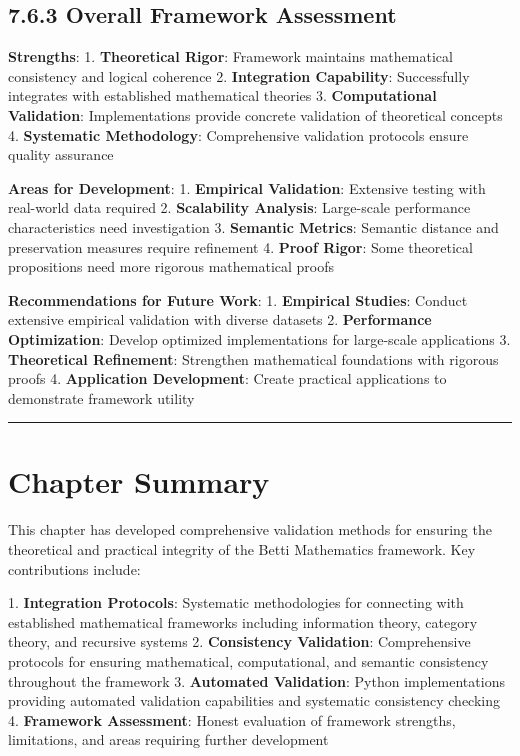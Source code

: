 \subsection{7.6.3 Overall Framework Assessment}

\textbf{Strengths}:
1. \textbf{Theoretical Rigor}: Framework maintains mathematical consistency and logical coherence
2. \textbf{Integration Capability}: Successfully integrates with established mathematical theories
3. \textbf{Computational Validation}: Implementations provide concrete validation of theoretical concepts
4. \textbf{Systematic Methodology}: Comprehensive validation protocols ensure quality assurance

\textbf{Areas for Development}:
1. \textbf{Empirical Validation}: Extensive testing with real-world data required
2. \textbf{Scalability Analysis}: Large-scale performance characteristics need investigation
3. \textbf{Semantic Metrics}: Semantic distance and preservation measures require refinement
4. \textbf{Proof Rigor}: Some theoretical propositions need more rigorous mathematical proofs

\textbf{Recommendations for Future Work}:
1. \textbf{Empirical Studies}: Conduct extensive empirical validation with diverse datasets
2. \textbf{Performance Optimization}: Develop optimized implementations for large-scale applications
3. \textbf{Theoretical Refinement}: Strengthen mathematical foundations with rigorous proofs
4. \textbf{Application Development}: Create practical applications to demonstrate framework utility

\hrule

\section{Chapter Summary}

This chapter has developed comprehensive validation methods for ensuring the theoretical and practical integrity of the Betti Mathematics framework. Key contributions include:

1. \textbf{Integration Protocols}: Systematic methodologies for connecting with established mathematical frameworks including information theory, category theory, and recursive systems
2. \textbf{Consistency Validation}: Comprehensive protocols for ensuring mathematical, computational, and semantic consistency throughout the framework
3. \textbf{Automated Validation}: Python implementations providing automated validation capabilities and systematic consistency checking
4. \textbf{Framework Assessment}: Honest evaluation of framework strengths, limitations, and areas requiring further development

